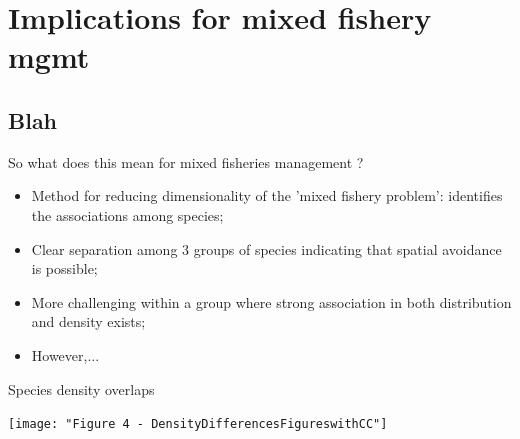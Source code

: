 \documentclass[xcolor=x11names,compress]{beamer}
\renewcommand{\(}{\begin{columns}}
\renewcommand{\)}{\end{columns}}
\newcommand{\<}[1]{\begin{column}{#1}}
\renewcommand{\>}{\end{column}}
\begin{document}

\begin{frame}{}
\end{frame}

\begin{frame}{}
\end{frame}


\section{Implications for mixed fishery mgmt}
\subsection{Blah}

\begin{frame}{So what does this mean for mixed fisheries management ?}

	\begin{itemize}
		\item Method for reducing dimensionality of the 'mixed fishery
			problem': identifies the associations among species;
		\item Clear separation among 3 groups of species indicating
			that spatial avoidance is possible;
		\item More challenging within a group where strong association
			in both distribution and density exists;
		\item However,...
	\end{itemize}

\end{frame}

\begin{frame}{Species density overlaps}
	
\centering
\texttt{[image: "Figure 4 - DensityDifferencesFigureswithCC"]}

\end{frame}
\end{document}
